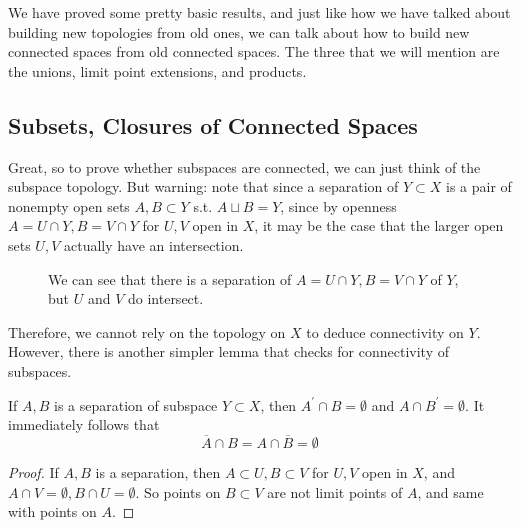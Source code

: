   We have proved some pretty basic results, and just like how we have talked about building new topologies from old ones, we can talk about how to build new connected spaces from old connected spaces. The three that we will mention are the unions, limit point extensions, and products. 

\subsection{Subsets, Closures of Connected Spaces}

  Great, so to prove whether subspaces are connected, we can just think of the subspace topology. But warning: note that since a separation of $Y \subset X$ is a pair of nonempty open sets $A, B \subset Y$ s.t. $A \sqcup B = Y$, since by openness $A = U \cap Y, B = V \cap Y$ for $U, V$ open in $X$, it may be the case that the larger open sets $U, V$ actually have an intersection. 

  \begin{figure}[H]
    \centering 
    \caption{We can see that there is a separation of $A = U \cap Y, B = V \cap Y$ of $Y$, but $U$ and $V$ do intersect.} 
  \end{figure}

  Therefore, we cannot rely on the topology on $X$ to deduce connectivity on $Y$. However, there is another simpler lemma that checks for connectivity of subspaces. 

  \begin{lemma}
    If $A, B$ is a separation of subspace $Y \subset X$, then $A^\prime \cap B = \emptyset$ and $A \cap B^\prime = \emptyset$. It immediately follows that 
    \begin{equation}
      \overline{A} \cap B = A \cap \overline{B} = \emptyset
    \end{equation}
  \end{lemma}
  \begin{proof}
    If $A, B$ is a separation, then $A \subset U, B \subset V$ for $U, V$ open in $X$, and $A \cap V = \emptyset, B \cap U = \emptyset$. So points on $B \subset V$ are not limit points of $A$, and same with points on $A$. 
  \end{proof} 

